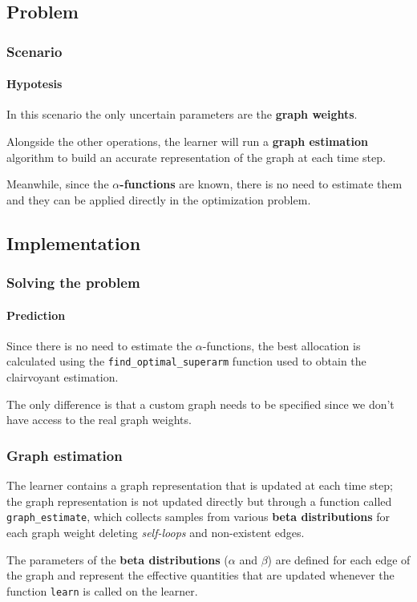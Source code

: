 
\subsection{Problem}


\begin{frame}

\frametitle{Scenario}
\framesubtitle{Hypotesis}

In this scenario the only uncertain parameters are the \textbf{graph weights}.

Alongside the other operations, the learner will run a \textbf{graph estimation} algorithm to build an accurate representation of the graph at each time step.

Meanwhile, since the \textbf{$\alpha$-functions} are known, there is no need to estimate them and they can be applied directly in the optimization problem.

\end{frame}


\subsection{Implementation}


\begin{frame}

\frametitle{Solving the problem}
\framesubtitle{Prediction}

Since there is no need to estimate the $\alpha$-functions, the best allocation is calculated using the \texttt{find\_optimal\_superarm} function used to obtain the clairvoyant estimation.

The only difference is that a custom graph needs to be specified since we don't have access to the real graph weights.

\end{frame}


\begin{frame}

\frametitle{Graph estimation}

The learner contains a graph representation that is updated at each time step; the graph representation is not updated directly but through a function called \texttt{graph\_estimate}, which collects samples from various \textbf{beta distributions} for each graph weight deleting \textit{self-loops} and non-existent edges.

The parameters of the \textbf{beta distributions} ($\alpha$ and $\beta$) are defined for each edge of the graph and represent the effective quantities that are updated whenever the function \texttt{learn} is called on the learner.

\end{frame}

